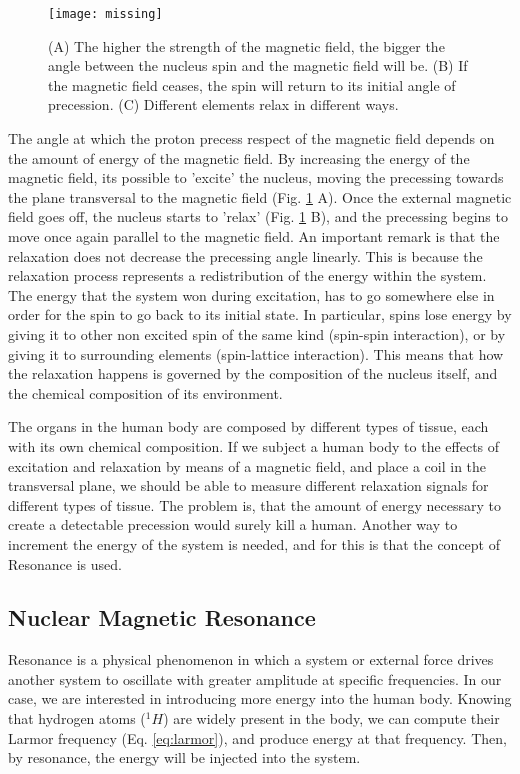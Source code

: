 \begin{figure}[h]
    \texttt{[image: missing]}
    \caption{(A) The higher the strength of the magnetic field, the bigger the angle
             between the nucleus spin and the magnetic field will be. (B) If the
             magnetic field ceases, the spin will return to its initial angle
             of precession. (C) Different elements relax in different ways.}
    \label{fig:relaxation}\end{figure} 

The angle at which the proton precess respect of the magnetic field depends on
the amount of energy of the magnetic field. By increasing the energy of the
magnetic field, its possible to 'excite' the nucleus, moving the precessing towards
the plane transversal to the magnetic field (Fig. \ref{fig:relaxation} A).
Once the external magnetic field goes off, the nucleus starts to 'relax'
(Fig. \ref{fig:relaxation} B), and the precessing begins to move once
again parallel to the magnetic field. An important remark is that the relaxation
does not decrease the precessing angle linearly. This is because the relaxation
process represents a redistribution of the energy within the system. The energy that
the system won during excitation, has to go somewhere else in order for the
spin to go back to its initial state. In particular, spins lose energy by 
giving it to other non excited spin of the same kind (spin-spin interaction),
or by giving it to surrounding elements (spin-lattice interaction). This means
that how the relaxation happens is governed by the composition of the nucleus
itself, and the chemical composition of its environment.

The organs in the human body are composed by different types of tissue, each
with its own chemical composition. If we subject a human body to the effects
of excitation and relaxation by means of a magnetic field, and place a coil
in the transversal plane, we should be able to measure different relaxation
signals for different types of tissue. The problem is, that the amount of 
energy necessary to create a detectable precession would surely kill a human.
Another way to increment the energy of the system is needed, and for this is 
that the concept of Resonance is used.

\subsection{Nuclear Magnetic Resonance}
Resonance is a physical phenomenon in which a system or external force drives
another system to oscillate with greater amplitude at specific frequencies.
In our case, we are interested in introducing more energy into the human body.
Knowing that hydrogen atoms ($^1 H$) are widely present in the body, we can
compute their Larmor frequency (Eq. \ref{eq:larmor}), and produce energy at
that frequency. Then, by resonance, the energy will be injected into the system. 

